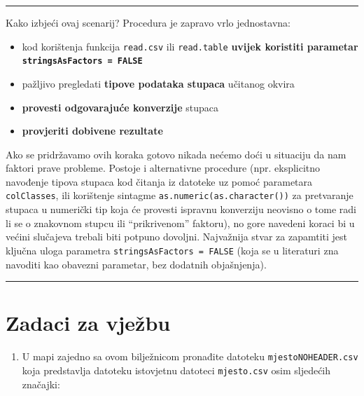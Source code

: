 \documentclass[]{book}
\providecommand{\tightlist}{%
  \setlength{\itemsep}{0pt}\setlength{\parskip}{0pt}}
\theoremstyle{definition}
\theoremstyle{definition}
\theoremstyle{definition}
\theoremstyle{remark}
\begin{document}
\begin{center}\rule{0.5\linewidth}{\linethickness}\end{center}

Kako izbjeći ovaj scenarij? Procedura je zapravo vrlo jednostavna:

\begin{itemize}
\tightlist
\item
  kod korištenja funkcija \texttt{read.csv} ili \texttt{read.table}
  \textbf{uvijek koristiti parametar
  \texttt{stringsAsFactors\ =\ FALSE}}
\item
  pažljivo pregledati \textbf{tipove podataka stupaca} učitanog okvira
\item
  \textbf{provesti odgovarajuće konverzije} stupaca
\item
  \textbf{provjeriti dobivene rezultate}
\end{itemize}

Ako se pridržavamo ovih koraka gotovo nikada nećemo doći u situaciju da
nam faktori prave probleme. Postoje i alternativne procedure (npr.
eksplicitno navođenje tipova stupaca kod čitanja iz datoteke uz pomoć
parametara \texttt{colClasses}, ili korištenje sintagme
\texttt{as.numeric(as.character())} za pretvaranje stupaca u numerički
tip koja će provesti ispravnu konverziju neovisno o tome radi li se o
znakovnom stupcu ili ``prikrivenom'' faktoru), no gore navedeni koraci
bi u većini slučajeva trebali biti potpuno dovoljni. Najvažnija stvar za
zapamtiti jest ključna uloga parametra
\texttt{stringsAsFactors\ =\ FALSE} (koja se u literaturi zna navoditi
kao obavezni parametar, bez dodatnih objašnjenja).

\begin{center}\rule{0.5\linewidth}{\linethickness}\end{center}

\section*{Zadaci za vježbu}\label{zadaci-za-vjezbu-2}

\begin{enumerate}
\def\labelenumi{\arabic{enumi}.}
\tightlist
\item
  U mapi zajedno sa ovom bilježnicom pronađite datoteku
  \texttt{mjestoNOHEADER.csv} koja predstavlja datoteku istovjetnu
  datoteci \texttt{mjesto.csv} osim sljedećih značajki:
\end{enumerate}
\end{document}
